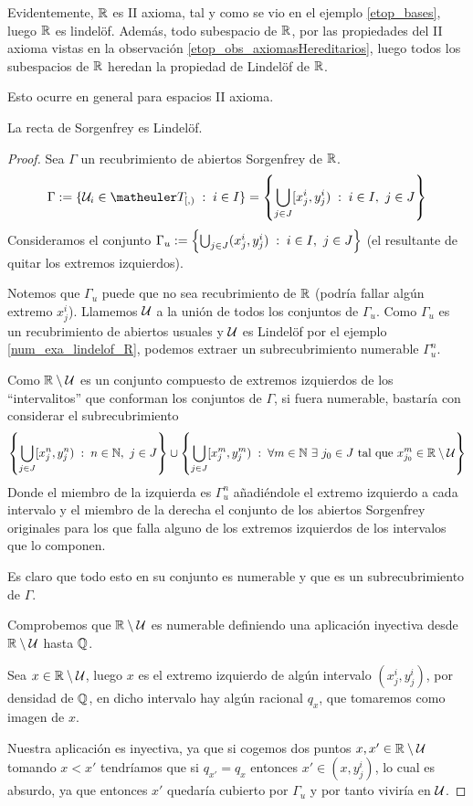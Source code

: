 \begin{exa}
	\label{num_exa_lindelof_R}
	Evidentemente, $\mathbb{R}$ es II axioma, tal y como se vio en el ejemplo \ref{etop_bases}, luego $\mathbb{R}$ es lindelöf. Además, todo subespacio de $\mathbb{R}$, por las propiedades del II axioma vistas en la observación \ref{etop_obs_axiomasHereditarios}, luego todos los subespacios de $\mathbb{R}$ heredan la propiedad de Lindelöf de $\mathbb{R}$.
	
	Esto ocurre en general para espacios II axioma.
\end{exa}
\begin{theo}
	La recta de Sorgenfrey es Lindelöf.
\end{theo}
\begin{proof}
	Sea $\Gamma$ un recubrimiento de abiertos Sorgenfrey de $\mathbb{R}$.
	\begin{equation*}
		\Gamma:=\{\U_i\in\T_{[,)}\midc i\in I\}=\left\{\bigcup_{j\in J}[x_j^i,y_j^i)\midc i\in I,\ j\in J\right\}
	\end{equation*}
	Consideramos el conjunto $\Gamma_u:=\left\{\bigcup_{j\in J}(x_j^i,y_j^i)\;:\; i\in I,\ j\in J\right\}$ (el resultante de quitar los extremos izquierdos).
	
	Notemos que $\Gamma_u$ puede que no sea recubrimiento de $\mathbb{R}$ (podría fallar algún extremo $x_j^i$). Llamemos $\mathcal{U}$ a la unión de todos los conjuntos de $\Gamma_u$. Como $\Gamma_u$ es un recubrimiento de abiertos usuales y $\mathcal{U}$ es Lindelöf por el ejemplo \ref{num_exa_lindelof_R}, podemos extraer un subrecubrimiento numerable $\Gamma_u^n$.
	
	Como $\mathbb{R}\setminus \mathcal{U}$ es un conjunto compuesto de extremos izquierdos de los ``intervalitos'' que conforman los conjuntos de $\Gamma$, si fuera numerable, bastaría con considerar el subrecubrimiento 
	\begin{equation*}
		\left\{\bigcup_{j\in J}[x_j^n,y_j^n)\;:\; n\in \mathbb{N},\ j\in J\right\}\cup\left\{\bigcup_{j\in J}[x_j^m,y_j^m)\;:\; \forall m\in\mathbb{N}\ \exists\ j_0\in J\text{ tal que } x_{j_0}^m\in\mathbb{R}\setminus\mathcal{U}\right\}
	\end{equation*}
	Donde el miembro de la izquierda es $\Gamma_u^n$ añadiéndole el extremo izquierdo a cada intervalo y el miembro de la derecha el conjunto de los abiertos Sorgenfrey originales para los que falla alguno de los extremos izquierdos de los intervalos que lo componen.
	
	Es claro que todo esto en su conjunto es numerable y que es un subrecubrimiento de $\Gamma$.
	
	Comprobemos que $\mathbb{R}\setminus\mathcal{U}$ es numerable definiendo una aplicación inyectiva desde $\mathbb{R}\setminus\mathcal{U}$ hasta $\mathbb{Q}$.
	
	Sea $x\in\mathbb{R}\setminus\mathcal{U}$, luego $x$ es el extremo izquierdo de algún intervalo $(x_j^i, y_j^i)$, por densidad de $\mathbb{Q}$, en dicho intervalo hay algún racional $q_x$, que tomaremos como imagen de $x$.
	
	Nuestra aplicación es inyectiva, ya que si cogemos dos puntos $x,x'\in\mathbb{R}\setminus\mathcal{U}$ tomando $x<x'$ tendríamos que si $q_{x'}=q_x$ entonces $x'\in(x,y_j^i)$, lo cual es absurdo, ya que entonces $x'$ quedaría cubierto por $\Gamma_u$ y por tanto viviría en $\mathcal{U}$.
\end{proof}
